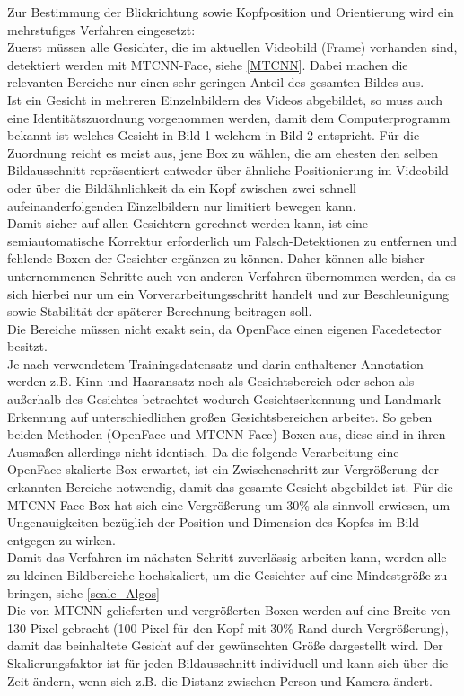 \label{Implementierung_Ablauf}

Zur Bestimmung der Blickrichtung sowie Kopfposition und Orientierung wird ein mehrstufiges Verfahren eingesetzt:\\
Zuerst müssen alle Gesichter, die im aktuellen Videobild (Frame) vorhanden sind, detektiert werden mit MTCNN-Face, siehe \autoref{MTCNN}. Dabei machen die relevanten Bereiche nur einen sehr geringen Anteil des gesamten Bildes aus.\\
Ist ein Gesicht in mehreren Einzelnbildern des Videos abgebildet, so muss auch eine Identitätszuordnung vorgenommen werden, damit dem Computerprogramm bekannt ist welches Gesicht in Bild 1 welchem in Bild 2 entspricht. Für die Zuordnung reicht es meist aus, jene Box zu wählen, die am ehesten den selben Bildausschnitt repräsentiert entweder über ähnliche Positionierung im Videobild oder über die Bildähnlichkeit da ein Kopf zwischen zwei schnell aufeinanderfolgenden Einzelbildern nur limitiert bewegen kann.\\
Damit sicher auf allen Gesichtern gerechnet werden kann, ist eine semiautomatische Korrektur erforderlich um Falsch-Detektionen zu entfernen und fehlende Boxen der Gesichter ergänzen zu können. Daher können alle bisher unternommenen Schritte auch von anderen Verfahren übernommen werden, da es sich hierbei nur um ein Vorverarbeitungsschritt handelt und zur Beschleunigung sowie Stabilität der späterer Berechnung beitragen soll.\\
Die Bereiche müssen nicht exakt sein, da OpenFace einen eigenen Facedetector besitzt.\\
Je nach verwendetem Trainingsdatensatz und darin enthaltener Annotation werden z.B. Kinn und Haaransatz noch als Gesichtsbereich oder schon als außerhalb des Gesichtes betrachtet wodurch  Gesichtserkennung und Landmark Erkennung auf unterschiedlichen großen Gesichtsbereichen arbeitet. So geben beiden Methoden (OpenFace und MTCNN-Face) Boxen aus, diese sind in ihren Ausmaßen allerdings nicht identisch. Da die folgende Verarbeitung eine OpenFace-skalierte Box erwartet, ist ein Zwischenschritt zur Vergrößerung der erkannten Bereiche notwendig, damit das gesamte Gesicht abgebildet ist. Für die MTCNN-Face Box hat sich eine Vergrößerung um $30\%$ als sinnvoll erwiesen, um Ungenauigkeiten bezüglich der Position und Dimension des Kopfes im Bild entgegen zu wirken.\\
Damit das Verfahren im nächsten Schritt zuverlässig arbeiten kann, werden alle zu kleinen Bildbereiche hochskaliert, um die Gesichter auf eine Mindestgröße zu bringen, siehe \autoref{scale_Algos}\\ Die von MTCNN gelieferten und vergrößerten Boxen werden auf eine Breite von 130 Pixel gebracht (100 Pixel für den Kopf mit $30\%$ Rand durch Vergrößerung), damit das beinhaltete Gesicht auf der gewünschten Größe dargestellt wird. Der Skalierungsfaktor ist für jeden Bildausschnitt individuell und kann sich über die Zeit ändern, wenn sich z.B. die Distanz zwischen Person und Kamera ändert.\\
